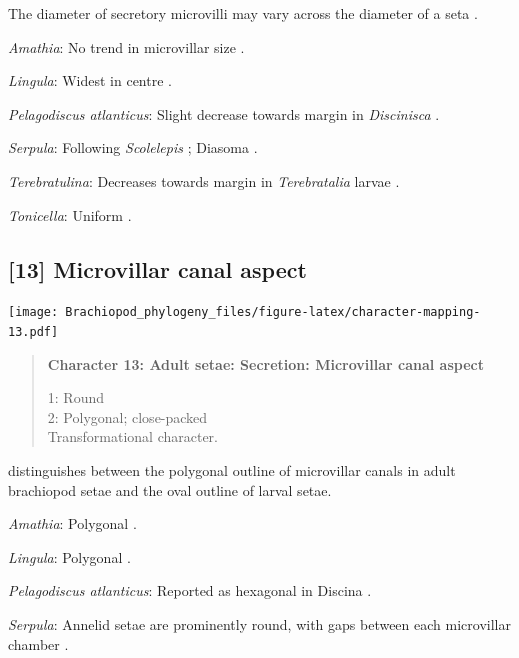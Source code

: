 \documentclass[openany]{book}
\begin{document}
The diameter of secretory microvilli may vary across the diameter of a
seta \citep{Smith2014}.

\hypertarget{Amathia-coding-12}{}
\emph{Amathia}: No trend in microvillar size \citep{Gordon1975}.

\hypertarget{Lingula-coding-12}{}
\emph{Lingula}: Widest in centre \citep{Luter2000}.

\hypertarget{Pelagodiscus_atlanticus-coding-12}{}
\emph{Pelagodiscus atlanticus}: Slight decrease towards margin in
\emph{Discinisca} \citep{Luter2003}.

\hypertarget{Serpula-coding-12}{}
\emph{Serpula}: Following \emph{Scolelepis} \citep{Hausen2005}; Diasoma
\citep{Orrhage1971}.

\hypertarget{Terebratulina-coding-12}{}
\emph{Terebratulina}: Decreases towards margin in \emph{Terebratalia}
larvae \citep{Gustus1972}.

\hypertarget{Tonicella-coding-12}{}
\emph{Tonicella}: Uniform \citep{Fischer1980, Leise1982}.

\subsection*{{[}13{]} Microvillar canal
aspect}\label{microvillar-canal-aspect}

\texttt{[image: Brachiopod\_phylogeny\_files/figure-latex/character-mapping-13.pdf]}

\begin{quote}
\textbf{Character 13: Adult setae: Secretion: Microvillar canal aspect}

1: Round\\
2: Polygonal; close-packed\\
Transformational character.
\end{quote}

\citet{Luter2000} distinguishes between the polygonal outline of
microvillar canals in adult brachiopod setae and the oval outline of
larval setae.

\hypertarget{Amathia-coding-13}{}
\emph{Amathia}: Polygonal \citep{Gordon1975}.

\hypertarget{Lingula-coding-13}{}
\emph{Lingula}: Polygonal \citep{Luter2000}.

\hypertarget{Pelagodiscus_atlanticus-coding-13}{}
\emph{Pelagodiscus atlanticus}: Reported as hexagonal in Discina
\citep{Luter2000}.

\hypertarget{Serpula-coding-13}{}
\emph{Serpula}: Annelid setae are prominently round, with gaps between
each microvillar chamber \citep{Orrhage1971}.
\end{document}
